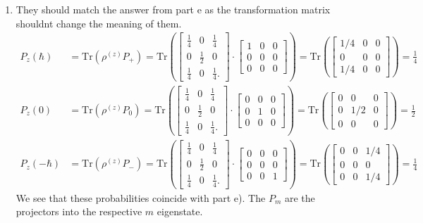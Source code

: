 \documentclass[letterpaper,11pt,twoside]{article}
\begin{document}
\begin{enumerate}[itemsep=0pt,topsep=0pt,label=\alph*)]
\begin{align*}
\begin{bmatrix}
    \end{bmatrix}\right)=0.
  \end{align*}
  \item They should match the answer from part e as the transformation matrix shouldnt change the meaning of them.
  \begin{align*}
    P_z(\hbar)&=\text{Tr}(\rho^{(z)}P_+)=\text{Tr}\left(\begin{bmatrix}
      \frac{1}{4}&0&\frac{1}{4}\\0&\frac{1}{2}&0\\\frac{1}{4}&0&\frac{1}{4}.
    \end{bmatrix}\cdot\begin{bmatrix}
      1&0&0\\0&0&0\\0&0&0
    \end{bmatrix}\right)=\text{Tr}\left(\begin{bmatrix}
      1/4&0&0\\0&0&0\\1/4&0&0
    \end{bmatrix}\right)=\frac{1}{4}\\
    P_z(0)&=\text{Tr}(\rho^{(z)}P_0)=\text{Tr}\left(\begin{bmatrix}
      \frac{1}{4}&0&\frac{1}{4}\\0&\frac{1}{2}&0\\\frac{1}{4}&0&\frac{1}{4}.
    \end{bmatrix}\cdot\begin{bmatrix}
      0&0&0\\0&1&0\\0&0&0
    \end{bmatrix}\right)=\text{Tr}\left(\begin{bmatrix}
      0&0&0\\0&1/2&0\\0&0&0
    \end{bmatrix}\right)=\frac{1}{2}\\
    P_z(-\hbar)&=\text{Tr}(\rho^{(z)}P_-)=\text{Tr}\left(\begin{bmatrix}
      \frac{1}{4}&0&\frac{1}{4}\\0&\frac{1}{2}&0\\\frac{1}{4}&0&\frac{1}{4}.
    \end{bmatrix}\cdot\begin{bmatrix}
      0&0&0\\0&0&0\\0&0&1
    \end{bmatrix}\right)=\text{Tr}\left(\begin{bmatrix}
      0&0&1/4\\0&0&0\\0&0&1/4
    \end{bmatrix}\right)=\frac{1}{4}
  \end{align*}
  We see that these probabilities coincide with part e). The $P_m$ are the projectors into the respective $m$ eigenstate.
\end{enumerate}
\end{document}
